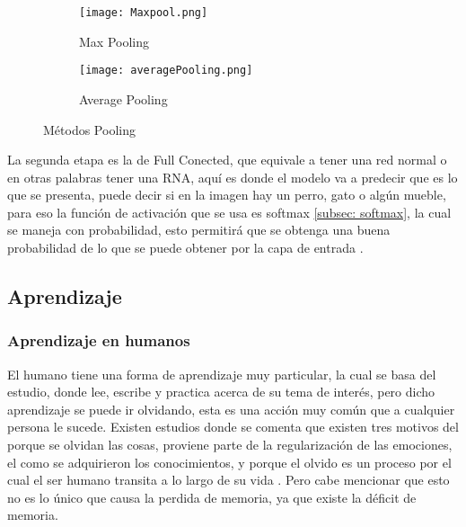             \begin{figure}[H]
                \begin{subfigure}[H]{0.49\textwidth}
                    \texttt{[image: Maxpool.png]}
                    \caption{Max Pooling}
                    \label{fig:f3}
                \end{subfigure}
                \hfill
                \begin{subfigure}[H]{0.49\textwidth}
                    \texttt{[image: averagePooling.png]}
                    \caption{Average Pooling}
                    \label{fig:f4}
                \end{subfigure}
                \caption{M\'etodos Pooling}
            \end{figure}

            La segunda etapa es la de Full Conected, que equivale a tener una red normal o en otras palabras tener una RNA, aqu\'i 
            es donde el modelo va a predecir que es lo que se presenta, puede decir si en la imagen hay un perro, gato o alg\'un mueble, 
            para eso la funci\'on de activaci\'on que se usa es softmax \eqref{subsec: softmax}, la cual se maneja con probabilidad, esto
            permitirá que se obtenga una buena probabilidad de lo que se puede obtener por la capa de entrada \cite{duran2017,Ortiz2020}.\\
  

\subsection{Aprendizaje}

    \subsubsection{Aprendizaje en humanos}
    	
    	
        El humano tiene una forma de aprendizaje muy particular, la cual se basa del estudio, donde lee, escribe y practica acerca de
        su tema de interés, pero dicho aprendizaje se puede ir olvidando, esta es una acción muy común que a cualquier persona le sucede.
        Existen estudios donde se comenta que existen tres motivos del porque se olvidan las cosas, proviene parte de la regularización de las emociones,
        el como se adquirieron los conocimientos, y porque el olvido es un proceso por el cual el ser humano transita a lo largo de su vida \cite{Nrby2015}. Pero cabe
        mencionar que esto no es lo único que causa la perdida de memoria, ya que existe la déficit de memoria. 

